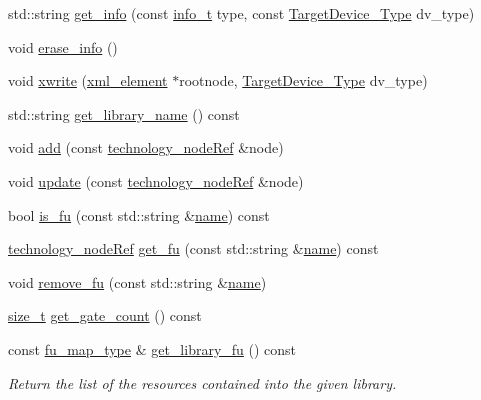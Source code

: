 \begin{DoxyCompactItemize}
\item 
std\+::string \hyperlink{classlibrary__manager_a61e98740a159d328dc986c4729844162}{get\+\_\+info} (const \hyperlink{classlibrary__manager_a5914a62c60d05c22f2547de9d8ef20de}{info\+\_\+t} type, const \hyperlink{target__device_8hpp_a476becc690220f0805ce73006449c732}{Target\+Device\+\_\+\+Type} dv\+\_\+type)
\item 
void \hyperlink{classlibrary__manager_aceba51458eebf43796ae8e9555410738}{erase\+\_\+info} ()
\item 
void \hyperlink{classlibrary__manager_a696beb5208cbe5a27144d59757b72682}{xwrite} (\hyperlink{classxml__element}{xml\+\_\+element} $\ast$rootnode, \hyperlink{target__device_8hpp_a476becc690220f0805ce73006449c732}{Target\+Device\+\_\+\+Type} dv\+\_\+type)
\item 
std\+::string \hyperlink{classlibrary__manager_a7e17dbc69eacaabce39da9168451c3c8}{get\+\_\+library\+\_\+name} () const
\item 
void \hyperlink{classlibrary__manager_a7be2eb51058e7ea1f0e7f465f1bc2e19}{add} (const \hyperlink{technology__node_8hpp_a33dd193b7bd6b987bf0d8a770a819fa7}{technology\+\_\+node\+Ref} \&node)
\item 
void \hyperlink{classlibrary__manager_a390325203aa42f2c6d71f601fd1ba8f4}{update} (const \hyperlink{technology__node_8hpp_a33dd193b7bd6b987bf0d8a770a819fa7}{technology\+\_\+node\+Ref} \&node)
\item 
bool \hyperlink{classlibrary__manager_a8b79f093ebc0949d2e87ba84e185a361}{is\+\_\+fu} (const std\+::string \&\hyperlink{classlibrary__manager_a6d92e10c68ec4a2975d832b0650c7168}{name}) const
\item 
\hyperlink{technology__node_8hpp_a33dd193b7bd6b987bf0d8a770a819fa7}{technology\+\_\+node\+Ref} \hyperlink{classlibrary__manager_a70a66a780470a75540aee74e21a5c3bf}{get\+\_\+fu} (const std\+::string \&\hyperlink{classlibrary__manager_a6d92e10c68ec4a2975d832b0650c7168}{name}) const
\item 
void \hyperlink{classlibrary__manager_a7ae8884cb2871b3cab0ea9b83dcb5829}{remove\+\_\+fu} (const std\+::string \&\hyperlink{classlibrary__manager_a6d92e10c68ec4a2975d832b0650c7168}{name})
\item 
\hyperlink{tutorial__fpt__2017_2intro_2sixth_2test_8c_a7c94ea6f8948649f8d181ae55911eeaf}{size\+\_\+t} \hyperlink{classlibrary__manager_a7de047085c8a9e56751b635aeee4657e}{get\+\_\+gate\+\_\+count} () const
\item 
const \hyperlink{classlibrary__manager_a17941addb97906d7b41c5b0b0317fde2}{fu\+\_\+map\+\_\+type} \& \hyperlink{classlibrary__manager_a5e6cca29a6c2e2f96563c059371cd79e}{get\+\_\+library\+\_\+fu} () const
\begin{DoxyCompactList}\small\item\em Return the list of the resources contained into the given library. \end{DoxyCompactList}\end{DoxyCompactItemize}
